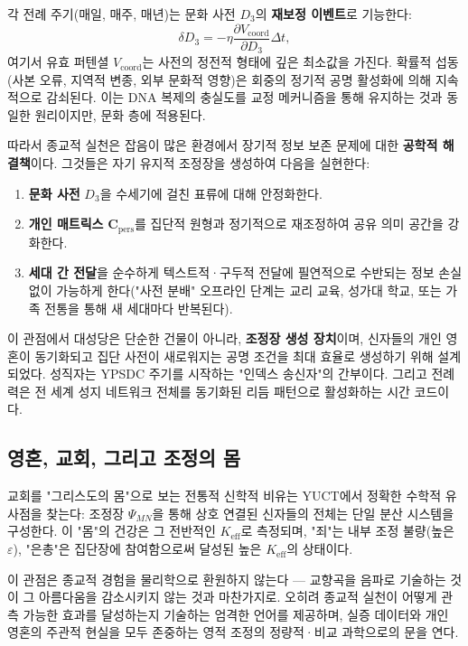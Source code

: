 \documentclass[12pt,a4paper]{article}
\begin{document}
	각 전례 주기(매일, 매주, 매년)는 문화 사전 \(D_3\)의 \textbf{재보정 이벤트}로 기능한다:
	\begin{equation}
		\delta D_3 = -\eta \frac{\partial V_{\text{coord}}}{\partial D_3} \Delta t,
	\end{equation}
	여기서 유효 퍼텐셜 \(V_{\text{coord}}\)는 사전의 정전적 형태에 깊은 최소값을 가진다. 확률적 섭동(사본 오류, 지역적 변종, 외부 문화적 영향)은 회중의 정기적 공명 활성화에 의해 지속적으로 감쇠된다. 이는 DNA 복제의 충실도를 교정 메커니즘을 통해 유지하는 것과 동일한 원리이지만, 문화 층에 적용된다.
	
	따라서 종교적 실천은 잡음이 많은 환경에서 장기적 정보 보존 문제에 대한 \textbf{공학적 해결책}이다. 그것들은 자기 유지적 조정장을 생성하여 다음을 실현한다:
	\begin{enumerate}
		\item \textbf{문화 사전} \(D_3\)을 수세기에 걸친 표류에 대해 안정화한다.
		\item \textbf{개인 매트릭스} \(\mathbf{C}_{\text{pers}}\)를 집단적 원형과 정기적으로 재조정하여 공유 의미 공간을 강화한다.
		\item \textbf{세대 간 전달}을 순수하게 텍스트적·구두적 전달에 필연적으로 수반되는 정보 손실 없이 가능하게 한다("사전 분배" 오프라인 단계는 교리 교육, 성가대 학교, 또는 가족 전통을 통해 새 세대마다 반복된다).
	\end{enumerate}
	
	이 관점에서 대성당은 단순한 건물이 아니라, \textbf{조정장 생성 장치}이며, 신자들의 개인 영혼이 동기화되고 집단 사전이 새로워지는 공명 조건을 최대 효율로 생성하기 위해 설계되었다. 성직자는 YPSDC 주기를 시작하는 "인덱스 송신자"의 간부이다. 그리고 전례력은 전 세계 성지 네트워크 전체를 동기화된 리듬 패턴으로 활성화하는 시간 코드이다.
	
	\subsection{영혼, 교회, 그리고 조정의 몸}
	
	교회를 "그리스도의 몸"으로 보는 전통적 신학적 비유는 YUCT에서 정확한 수학적 유사점을 찾는다: 조정장 \(\Psi_{MN}\)을 통해 상호 연결된 신자들의 전체는 단일 분산 시스템을 구성한다. 이 "몸"의 건강은 그 전반적인 \(K_{\mathrm{eff}}\)로 측정되며, "죄"는 내부 조정 불량(높은 \(\varepsilon\)), "은총"은 집단장에 참여함으로써 달성된 높은 \(K_{\mathrm{eff}}\)의 상태이다.
	
	이 관점은 종교적 경험을 물리학으로 환원하지 않는다 — 교향곡을 음파로 기술하는 것이 그 아름다움을 감소시키지 않는 것과 마찬가지로. 오히려 종교적 실천이 어떻게 관측 가능한 효과를 달성하는지 기술하는 엄격한 언어를 제공하며, 실증 데이터와 개인 영혼의 주관적 현실을 모두 존중하는 영적 조정의 정량적·비교 과학으로의 문을 연다.
	
\end{document}
